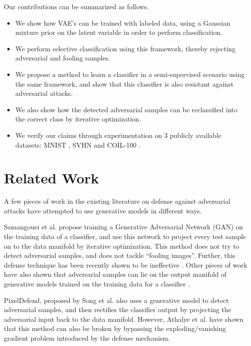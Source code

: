 \documentclass[letterpaper]{article} %
\begin{document}
Our contributions can be summarized as follows.
\begin{itemize}
\item We show how VAE's can be trained with labeled data, using a Gaussian mixture prior on the latent variable in order to perform classification.
\item We perform selective classification using this framework, thereby rejecting adversarial and fooling samples.
\item We propose a method to learn a classifier in a semi-supervised scenario using the same framework, and show that this classifier is also resistant against adversarial attacks.
\item We also show how the detected adversarial samples can be reclassified into the correct class by iterative optimization.
\item We verify our claims through experimentation on 3 publicly available datasets: MNIST , SVHN  and COIL-100  .
\end{itemize}

\section{Related Work}
A few pieces of work in the existing literature on defense against adversarial attacks have attempted to use generative models in different ways.

Samangouei et al.  propose training a Generative Adversarial Network (GAN) on the training data of a classifier, and use this network to project every test sample on to the data manifold by iterative optimization. This method does not try to detect adversarial samples, and does not tackle ``fooling images''. Further, this defense technique has been recently shown to be ineffective . Other pieces of work have also shown that adversarial samples can lie on the output manifold of generative models trained on the training data for a classifier .

PixelDefend, proposed by Song et al.  also uses a generative model to detect adversarial samples, and then rectifies the classifier output by projecting the adversarial input back to the data manifold. However, Athalye et al. have shown that this method can also be broken by bypassing the exploding/vanishing gradient problem introduced by the defense mechanism.
\end{document}
